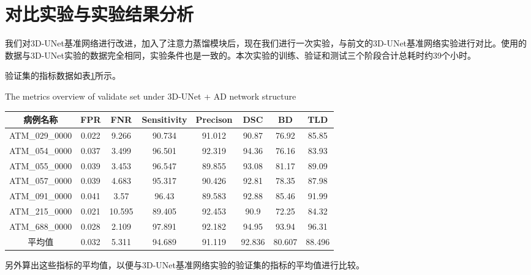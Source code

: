 \section{对比实验与实验结果分析}
我们对3D-UNet基准网络进行改进，加入了注意力蒸馏模块后，现在我们进行一次实验，与前文的3D-UNet基准网络实验进行对比。使用的
数据与3D-UNet实验的数据完全相同，实验条件也是一致的。本次实验的训练、验证和测试三个阶段合计总耗时约39个小时。

验证集的指标数据如表\ref{tbl:3dunet_ad_metrics_valset}所示。
\begin{table}[htb]
    \centering
        {The metrics overview of validate set under 3D-UNet + AD network structure}
    \label{tbl:3dunet_ad_metrics_valset}
    \begin{tabular}{cccccccc}
        \toprule
        病例名称 & FPR & FNR & Sensitivity & Precison & DSC & BD & TLD \\
        \midrule
        ATM\_029\_0000 & 0.022 & 9.266  & 90.734 & 91.012 & 90.87 & 76.92  & 85.85  \\
        ATM\_054\_0000 & 0.037 & 3.499  & 96.501 & 92.319 & 94.36 & 76.16  & 83.93  \\
        ATM\_055\_0000 & 0.039 & 3.453  & 96.547 & 89.855 & 93.08 & 81.17  & 89.09  \\
        ATM\_057\_0000 & 0.039 & 4.683  & 95.317 & 90.426 & 92.81 & 78.35  & 87.98  \\
        ATM\_091\_0000 & 0.041 & 3.57   & 96.43  & 89.583 & 92.88 & 85.46  & 91.99  \\
        ATM\_215\_0000 & 0.021 & 10.595 & 89.405 & 92.453 & 90.9  & 72.25  & 84.32  \\
        ATM\_688\_0000 & 0.028 & 2.109  & 97.891 & 92.182 & 94.95 & 93.94  & 96.31  \\
        \midrule
        平均值 & 0.032 & 5.311 & 94.689 & 91.119 & 92.836 & 80.607 & 88.496 \\
        \bottomrule
    \end{tabular}
\end{table}
另外算出这些指标的平均值，以便与3D-UNet基准网络实验的验证集的指标的平均值进行比较。


